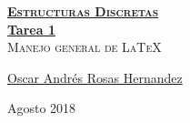 \documentclass[12pt, fleqn]{article}                            %
\author{Oscar Andrés Rosas}                                     %
\theoremstyle{break}                                            %
\begin{document}
\begin{titlepage}
    
    \pagecolor{TitlePageColor}                                      %
    \color{white}                                                   %

    \vspace                                                         %
    \baselineskip                                                   %

    \makebox[0pt][l]{\rule{1.3\textwidth}{3pt}}                     %
    
    \href{https://compilandoconocimiento.com}                       %
    {\textbf{\textsc{\Huge Estructuras Discretas}}}\\[2.7cm]      %

    \href{\ProjectNameLink}                                         %
    {\fontsize{45}{52}\selectfont \textbf{Tarea 1}}\\[0.5cm]        %
    \textcolor{ColorSubtext}{\textsc{\Huge Manejo general de \LaTeX}}     %
    
    \vfill                                                          %
    
    \href{\ProjectAuthorLink}                                       %
    {\LARGE \textsf{Oscar Andrés Rosas Hernandez}}                  %

    \vspace                                                         %
    \baselineskip                                                   %
    
    {\large \textsf{Agosto 2018}}                                    %

\end{titlepage}
\end{document}
